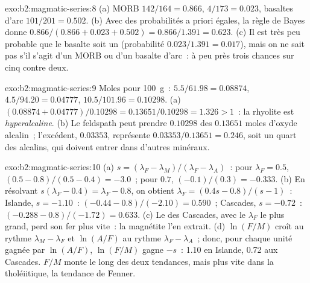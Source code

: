 \begin{solution}{exo:b2:magmatic-series:8}
(a) MORB $142/164 = 0.866$,  $4/173 = 0.023$, basaltes d'arc $101/201 =
0.502$. (b) Avec des probabilités a priori égales, la règle de Bayes donne $0.866/(0.866 + 0.023 + 0.502) =
0.866/1.391 = 0.623$. (c) Il est très peu probable que le basalte soit un 
(probabilité $0.023/1.391 = 0.017$), mais on ne sait pas s'il s'agit d'un MORB ou d'un basalte d'arc~:
à peu près trois chances sur cinq contre deux.
\end{solution}

\begin{solution}{exo:b2:magmatic-series:9}
Moles pour \qty{100}{g}~:  $5.5/61.98 = 0.08874$,  $4.5/94.20 =
0.04777$,  $10.5/101.96 = 0.10298$. (a) $(0.08874 + 0.04777)/0.10298 =
0.13651/0.10298 = 1.326 > 1$~: la rhyolite est \emph{hyperalcaline}. (b) Le feldspath peut
prendre $0.10298$ des $0.13651$ moles d'oxyde alcalin~; l'excédent, $0.03353$, représente
$0.03353/0.13651 = 0.246$, soit un quart des alcalins, qui doivent entrer dans d'autres minéraux.
\end{solution}

\begin{solution}{exo:b2:magmatic-series:10}
(a) $s = (\lambda_F - \lambda_M)/(\lambda_F - \lambda_A)$~: pour $\lambda_F = 0.5$, $(0.5
- 0.8)/(0.5 - 0.4) = -3.0$~; pour $0.7$, $(-0.1)/(0.3) = -0.333$. (b) En résolvant
$s(\lambda_F - 0.4) = \lambda_F - 0.8$, on obtient $\lambda_F = (0.4s - 0.8)/(s - 1)$~:
Islande, $s = -1.10$~: $(-0.44 - 0.8)/(-2.10) = 0.590$~; Cascades, $s = -0.72$~:
$(-0.288 - 0.8)/(-1.72) = 0.633$. (c) Le  des Cascades, avec le $\lambda_F$ le plus grand,
perd son fer plus vite~: la magnétite l'en extrait. (d) $\ln(F/M)$ croît au rythme
$\lambda_M - \lambda_F$ et $\ln(A/F)$ au rythme $\lambda_F - \lambda_A$~; donc, pour chaque unité
gagnée par $\ln(A/F)$, $\ln(F/M)$ gagne $-s$~: 1.10 en Islande, 0.72 aux Cascades. $F/M$ monte
le long des deux tendances, mais plus vite dans la
tholéiitique, la tendance de Fenner.
\end{solution}


